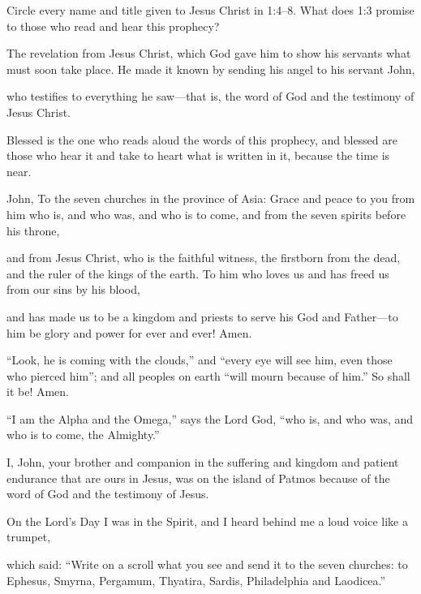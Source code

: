 \begin{ScriptureBox2}{Circle every name and title given to Jesus Christ in 1:4--8. What does 1:3 promise to those who read and hear this prophecy?}

\item[1:1] The revelation from Jesus Christ, which God gave him to show his servants what must soon take place. He made it known by sending his angel to his servant John,

\item[1:2] who testifies to everything he saw---that is, the word of God and the testimony of Jesus Christ.

\item[1:3] Blessed is the one who reads aloud the words of this prophecy, and blessed are those who hear it and take to heart what is written in it, because the time is near.

\item[1:4] John, To the seven churches in the province of Asia: Grace and peace to you from him who is, and who was, and who is to come, and from the seven spirits before his throne,

\item[1:5] and from Jesus Christ, who is the faithful witness, the firstborn from the dead, and the ruler of the kings of the earth. To him who loves us and has freed us from our sins by his blood,

\item[1:6] and has made us to be a kingdom and priests to serve his God and Father---to him be glory and power for ever and ever! Amen.

\item[1:7] ``Look, he is coming with the clouds,'' and ``every eye will see him, even those who pierced him''; and all peoples on earth ``will mourn because of him.'' So shall it be! Amen.

\item[1:8] ``I am the Alpha and the Omega,'' says the Lord God, ``who is, and who was, and who is to come, the Almighty.''

\item[1:9] I, John, your brother and companion in the suffering and kingdom and patient endurance that are ours in Jesus, was on the island of Patmos because of the word of God and the testimony of Jesus.

\item[1:10] On the Lord's Day I was in the Spirit, and I heard behind me a loud voice like a trumpet,

\item[1:11] which said: ``Write on a scroll what you see and send it to the seven churches: to Ephesus, Smyrna, Pergamum, Thyatira, Sardis, Philadelphia and Laodicea.''

\end{ScriptureBox2}

